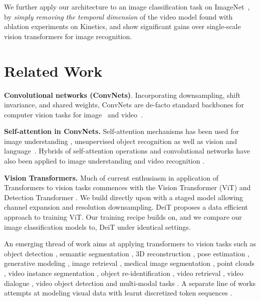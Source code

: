 \documentclass[10pt,twocolumn,letterpaper]{article}
\begin{document}
We further apply our architecture to an image classification task on \mbox{ImageNet}~\cite{deng2009imagenet}, by \textit{simply removing the temporal dimension} of the video model found with ablation experiments on Kinetics, and show significant gains over single-scale vision transformers for image recognition.

\section{Related Work}

\noindent\textbf{Convolutional networks (ConvNets)}. Incorporating downsampling, shift invariance, and shared weights, ConvNets are de-facto standard backbones for computer vision  tasks for image~\cite{lecun1989backpropagation,Krizhevsky2012,Simonyan2015,Szegedy2015,He2016a, chen2018big, chen2019drop, gao2019res2net, tan2019efficientnet, ilija_2020, resnest}  and video~\cite{Simonyan2014,Feichtenhofer2016, Carreira2017, Qiu2017, Li2018, Xie2018,Tran2019, Feichtenhofer2019, Wu2019, girdhar2019video, feichtenhofer2020x3d, Zhou2017, jiang2019stm}. 

\noindent\textbf{Self-attention in ConvNets.}
Self-attention mechanisms has been used for
image understanding \cite{ramachandran2019stand, zhao2020exploring, hu2019local}, unsupervised object recognition \cite{locatello2020object} as well as vision and language~\cite{lu2019vilbert, li2019visualbert}. 
Hybrids of self-attention operations and convolutional networks have also  been
applied to 
image understanding \cite{hu2018relation} and video recognition \cite{Wang2018}.

\noindent\textbf{Vision Transformers.} Much of current enthusiasm in application of Transformers \cite{vaswani2017attention} to vision tasks commences with the Vision Transformer (ViT) \cite{dosovitskiy2020image} and Detection Transformer  \cite{carion2020end}. We build directly upon \cite{dosovitskiy2020image} with a staged model allowing channel expansion and resolution downsampling. DeiT \cite{touvron2020training} proposes a data efficient approach to training ViT. Our training recipe builds on, and we compare our image classification models to, DeiT under identical settings.

An emerging thread of work aims at applying transformers to vision tasks such as object detection \cite{beal2020toward}, semantic segmentation \cite{zhao2020point,wang2020max}, 3D reconstruction \cite{lin2020end}, pose estimation \cite{yang2020transpose}, generative modeling \cite{chen2020generative}, image retrieval \cite{el2021training}, medical image segmentation \cite{chen2021transunet, valanarasu2021medical, yun2021spectr}, point clouds \cite{guo2020pct}, video instance segmentation \cite{wang2020end}, object re-identification \cite{he2021transreid}, video retrieval \cite{gabeur2020multi}, video dialogue \cite{le2019multimodal}, video object detection \cite{yuan2020temporal} and multi-modal tasks \cite{liu2021cptr, desai2020virtex, radford2021learning, hu2021transformer, yu2019multimodal}.
A separate line of works attempts at modeling visual data with learnt discretized token sequences \cite{wu2020visual, ramesh2021zero, chen2020generative,yuan2021tokens,chu2021we}. 
\end{document}
